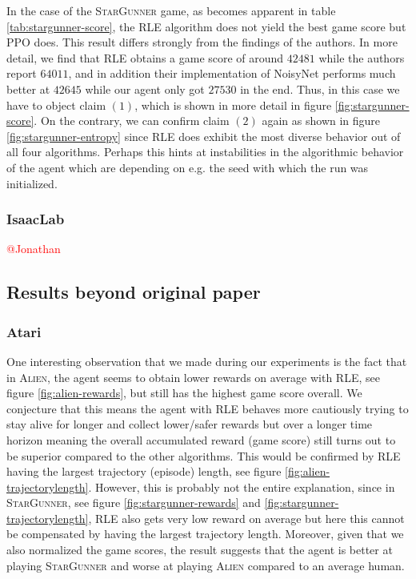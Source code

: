 \documentclass[10pt]{article} %
\begin{document}
\noindent In the case of the \textsc{StarGunner} game, as becomes apparent in table \ref{tab:stargunner-score}, the RLE algorithm does not yield the best game score but PPO does. This result differs strongly from the findings of the authors. In more detail, we find that RLE obtains a game score of around $42481$ while the authors report $64011$, and in addition their implementation of NoisyNet performs much better at $42645$ while our agent only got $27530$ in the end. Thus, in this case we have to object claim $(1)$, which is shown in more detail in figure \ref{fig:stargunner-score}. On the contrary, we can confirm claim $(2)$ again as shown in figure \ref{fig:stargunner-entropy} since RLE does exhibit the most diverse behavior out of all four algorithms. Perhaps this hints at instabilities in the algorithmic behavior of the agent which are depending on e.g. the seed with which the run was initialized.

\subsubsection{IsaacLab}
\textcolor{red}{@Jonathan}


\subsection{Results beyond original paper}

\subsubsection{Atari}

\noindent One interesting observation that we made during our experiments is the fact that in \textsc{Alien}, the agent seems to obtain lower rewards on average with RLE, see figure \ref{fig:alien-rewards}, but still has the highest game score overall. We conjecture that this means the agent with RLE behaves more cautiously trying to stay alive for longer and collect lower/safer rewards but over a longer time horizon meaning the overall accumulated reward (game score) still turns out to be superior compared to the other algorithms. This would be confirmed by RLE having the largest trajectory (episode) length, see figure \ref{fig:alien-trajectorylength}. However, this is probably not the entire explanation, since in \textsc{StarGunner}, see figure \ref{fig:stargunner-rewards} and \ref{fig:stargunner-trajectorylength}, RLE also gets very low reward on average but here this cannot be compensated by having the largest trajectory length. Moreover, given that we also normalized the game scores, the result suggests that the agent is better at playing \textsc{StarGunner} and worse at playing \textsc{Alien} compared to an average human.
\end{document}
